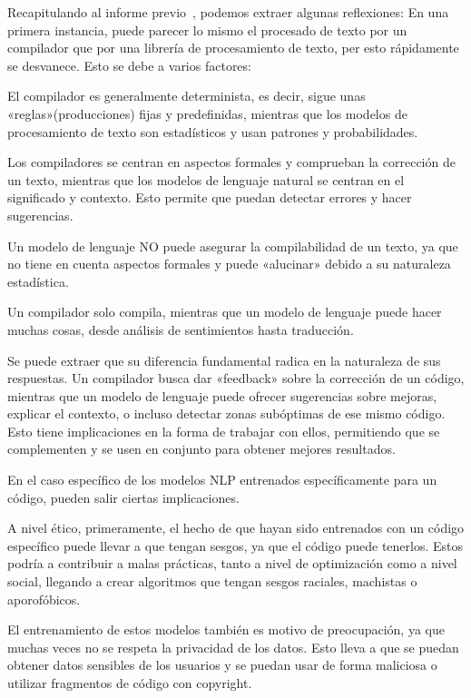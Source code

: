\documentclass[a4paper,twocolumn]{article}
\begin{document}
    Recapitulando al informe previo~\autocite{marcelo.informe1}, podemos extraer algunas reflexiones:
    En una primera instancia, puede parecer lo mismo el procesado de texto por un compilador que por una librería de procesamiento de texto,
    per esto rápidamente se desvanece.
    Esto se debe a varios factores:
    \begin{itemize}
    {
        \item El compilador es generalmente determinista, es decir, sigue unas «reglas»(producciones) fijas y predefinidas,
        mientras que los modelos de procesamiento de texto son estadísticos y usan patrones y probabilidades.
        \item Los compiladores se centran en aspectos formales y comprueban la corrección de un texto, mientras que los modelos de lenguaje natural se centran en el significado y contexto.
        Esto permite que puedan detectar errores y hacer sugerencias.
        \item Un modelo de lenguaje NO puede asegurar la compilabilidad de un texto, ya que no tiene en cuenta aspectos formales y puede «alucinar» debido a su naturaleza estadística.
        \item Un compilador solo compila, mientras que un modelo de lenguaje puede hacer muchas cosas, desde análisis de sentimientos hasta traducción.
    }
\end{itemize}
    Se puede extraer que su diferencia fundamental radica en la naturaleza de sus respuestas.
    Un compilador busca dar «feedback» sobre la corrección de un código,
    mientras que un modelo de lenguaje puede ofrecer sugerencias sobre mejoras, explicar el contexto, o incluso detectar zonas subóptimas de ese mismo código.
    Esto tiene implicaciones en la forma de trabajar con ellos,
    permitiendo que se complementen y se usen en conjunto para obtener mejores resultados.



    En el caso específico de los modelos NLP entrenados específicamente para un código, pueden salir ciertas implicaciones.

    A nivel ético,
    primeramente, el hecho de que hayan sido entrenados con un código específico puede llevar a que tengan sesgos, ya que el código puede tenerlos.
    Estos podría a contribuir a malas prácticas, tanto a nivel de optimización como a nivel social,
    llegando a crear algoritmos que tengan sesgos raciales, machistas o aporofóbicos.

    El entrenamiento de estos modelos  también es motivo de preocupación, ya que muchas veces no se respeta la privacidad de los datos.
    Esto lleva a que se puedan obtener datos sensibles de los usuarios y se puedan usar de forma maliciosa o utilizar fragmentos de código con copyright.
\end{document}
